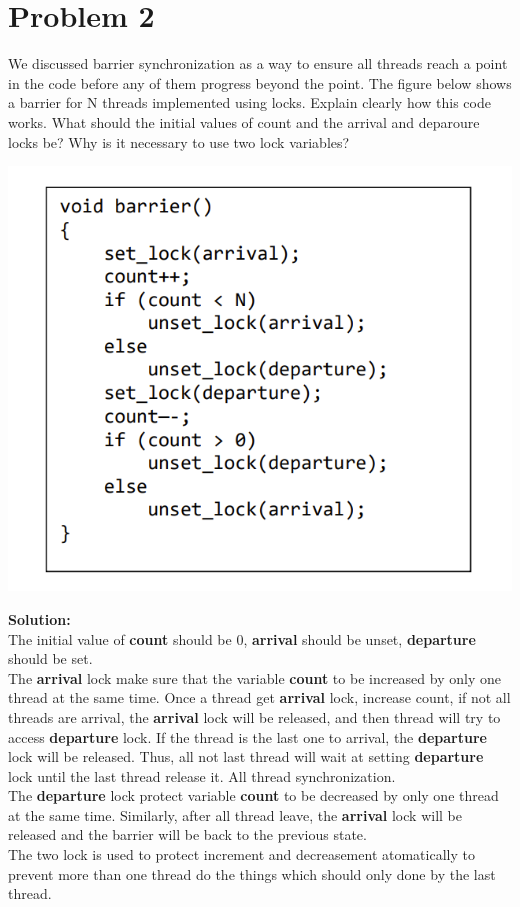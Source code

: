 \documentclass{article}
\begin{document}
\section{Problem 2}
We discussed barrier synchronization as a way to ensure all threads reach a point 
in the code before any of them progress beyond the point. The figure below 
shows a barrier for N threads implemented using locks. Explain clearly how 
this code works. What should the initial values of count and the arrival and 
deparoure locks be? Why is it necessary to use two lock variables? 
\begin{center}
    \includegraphics[scale = 0.4]{1.png}\\
\end{center}
\textbf{Solution:}\\
The initial value of \textbf{count} should be 0, \textbf{arrival} should be unset, \textbf{departure} should be set.\\
The \textbf{arrival} lock make sure that the variable \textbf{count} to be increased by only one thread at the same time. Once a thread get \textbf{arrival} lock, increase count, if not all threads are arrival, the \textbf{arrival} lock will be released, and then thread will try to access \textbf{departure} lock. If the thread is the last one to arrival, the \textbf{departure} lock will be released. Thus, all not last thread will wait at setting \textbf{departure} lock until the last thread release it. All thread synchronization.\\
The \textbf{departure} lock protect variable \textbf{count} to be decreased by only one thread at the same time. Similarly, after all thread leave, the \textbf{arrival} lock will be released and the barrier will be back to the previous state.\\
The two lock is used to protect increment and decreasement atomatically to prevent more than one thread do the things which should only done by the last thread.
\end{document}
